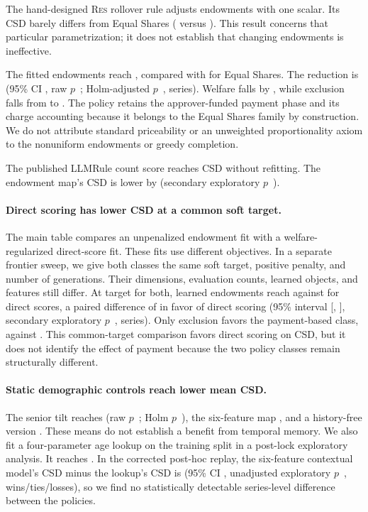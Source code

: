 \documentclass{article}
\newcommand{\RES}{\textsc{Res}}
\begin{document}
The hand-designed \RES{} rollover rule adjusts endowments with one scalar.
Its CSD barely differs from Equal Shares (\TestRESCSD{} versus
\TestMESCSD{}). This result concerns that particular parametrization; it does
not establish that changing endowments is ineffective.

The fitted endowments reach \EndowCSD{}, compared with \TestMESCSD{} for Equal
Shares. The reduction is \EndowSigMESDiffAbs{} (95\% CI \EndowSigMESCI,
raw $p$~\EndowSigMESP; Holm-adjusted $p$~\EndowSigMESHolmP,
\EndowSigMESWins{} series). Welfare falls by
\EndowWelfareCostPct{}, while exclusion falls from \TestMESExcl{} to
\EndowExcl{}. The policy retains the approver-funded payment phase and its
charge accounting because it belongs to the Equal Shares family by
construction. We do not attribute standard priceability or an unweighted
proportionality axiom to the nonuniform endowments or greedy completion.

The published LLMRule count score reaches CSD \LLMRuleCardCSD{} without
refitting. The endowment map's CSD is lower by
\EndowSigLLMRuleCardDiffAbs{} (secondary exploratory $p$~\EndowSigLLMRuleCardP).

\paragraph{Direct scoring has lower CSD at a common soft target.}
The main table compares an unpenalized endowment fit with a welfare-regularized
direct-score fit. These fits use different objectives. In a separate frontier
sweep, we give both classes the same soft target, positive penalty, and number
of generations. Their dimensions, evaluation counts, learned objects, and
features still differ. At target \LearnedHeadFloor{} for both,
learned endowments reach
\MatchedTargetEndowCSD{} against \MatchedTargetDirectCSD{} for direct scores, a
paired difference of \MatchedTargetDiff{} in favor of direct scoring (95\%
interval [\MatchedTargetCILow{}, \MatchedTargetCIHigh{}], secondary exploratory
$p$~\MatchedTargetP,
\MatchedTargetWins{} series). Only exclusion favors the payment-based class,
\MatchedTargetEndowExcl{} against \MatchedTargetDirectExcl{}. This common-target
comparison favors direct scoring on CSD, but it does not identify the effect of
payment because the two policy classes remain structurally different.

\paragraph{Static demographic controls reach lower mean CSD.}
The senior tilt reaches \TiltCSD{} (raw $p$~\TiltP; Holm $p$~\TiltHolmP), the
six-feature map \EndowCSD{}, and a history-free version \StaticTiltCSD{}.
These means do not establish a benefit from temporal memory. We also fit a
four-parameter age lookup on the training split in a post-lock exploratory
analysis. It reaches \AgeLookupCSD{}. In the corrected post-hoc replay, the
six-feature contextual model's CSD minus the lookup's CSD is
\ContextualVsAgeLookupDiff{} (95\% CI \ContextualVsAgeLookupCI,
unadjusted exploratory $p$~\ContextualVsAgeLookupP,
\ContextualVsAgeLookupRecord{} wins/ties/losses),
so we find no statistically detectable series-level difference between the policies.
\end{document}
